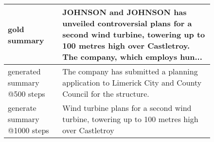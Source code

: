 \documentclass[11pt,a4paper]{article}
\begin{document}
\begin{figure*}[t]
\begin{adjustbox}{width=\textwidth}
\begin{tabular}{|p{}|p{}|}
    \hline
    gold summary & 	
    JOHNSON and JOHNSON has unveiled controversial plans for a second wind turbine, towering up to 100 metres high over Castletroy. The company, which employs hun... \\
    \hline
    generated summary @500 steps & The company has submitted a planning application to Limerick City and County Council for the structure.\\
    \hline
    generate summary @1000 steps & Wind turbine plans for a second wind turbine, towering up to 100 metres high over Castletroy\\
    \hline
    \end{tabular}
    \end{adjustbox}

    \end{figure*}
\end{document}
